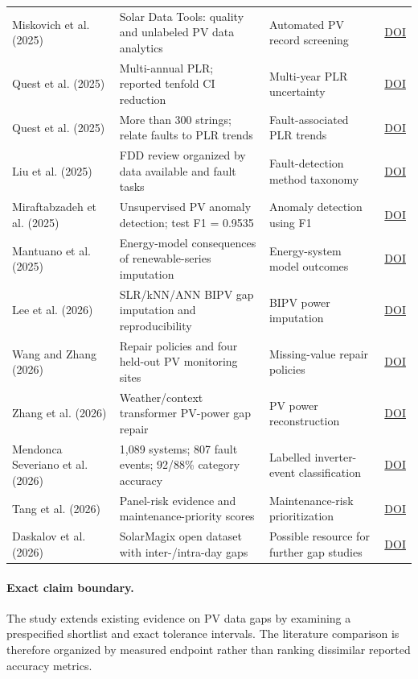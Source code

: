 \documentclass[11pt]{article}
\begin{document}
\begin{longtable}{L{2.75cm}L{4.6cm}L{6.3cm}L{1.2cm}}
Miskovich et al. (2025) & Solar Data Tools: quality and unlabeled PV data analytics & Automated PV record screening & \href{https://doi.org/10.21105/joss.08478}{DOI} \\
Quest et al. (2025) & Multi-annual PLR; reported tenfold CI reduction & Multi-year PLR uncertainty & \href{https://doi.org/10.1002/pip.3855}{DOI} \\
Quest et al. (2025) & More than 300 strings; relate faults to PLR trends & Fault-associated PLR trends & \href{https://doi.org/10.1002/solr.202500487}{DOI} \\
Liu et al. (2025) & FDD review organized by data available and fault tasks & Fault-detection method taxonomy & \href{https://doi.org/10.1016/j.apenergy.2025.126636}{DOI} \\
Miraftabzadeh et al. (2025) & Unsupervised PV anomaly detection; test F1 = 0.9535 & Anomaly detection using F1 & \href{https://doi.org/10.1016/j.segan.2025.101769}{DOI} \\
Mantuano et al. (2025) & Energy-model consequences of renewable-series imputation & Energy-system model outcomes & \href{https://doi.org/10.1016/j.enconman.2025.119857}{DOI} \\
Lee et al. (2026) & SLR/kNN/ANN BIPV gap imputation and reproducibility & BIPV power imputation & \href{https://doi.org/10.1016/j.solener.2026.114428}{DOI} \\
Wang and Zhang (2026) & Repair policies and four held-out PV monitoring sites & Missing-value repair policies & \href{https://doi.org/10.3390/s26206589}{DOI} \\
Zhang et al. (2026) & Weather/context transformer PV-power gap repair & PV power reconstruction & \href{https://doi.org/10.1016/j.renene.2025.124576}{DOI} \\
Mendonca Severiano et al. (2026) & 1,089 systems; 807 fault events; 92/88\% category accuracy & Labelled inverter-event classification & \href{https://doi.org/10.1016/j.solener.2026.114382}{DOI} \\
Tang et al. (2026) & Panel-risk evidence and maintenance-priority scores & Maintenance-risk prioritization & \href{https://doi.org/10.3390/s26144487}{DOI} \\
Daskalov et al. (2026) & SolarMagix open dataset with inter-/intra-day gaps & Possible resource for further gap studies & \href{https://doi.org/10.1016/j.dib.2026.112830}{DOI} \\
\end{longtable}
\endgroup

\paragraph{Exact claim boundary.} The study extends existing evidence on PV data gaps by examining a prespecified shortlist and exact tolerance intervals. The literature comparison is therefore organized by measured endpoint rather than ranking dissimilar reported accuracy metrics.
\end{document}

